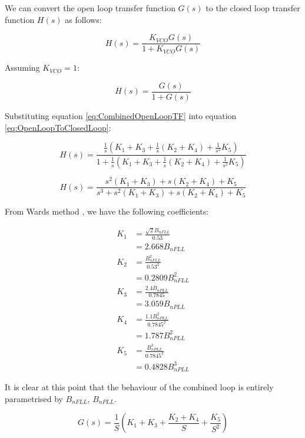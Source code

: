 We can convert the open loop transfer function $G(s)$ to the closed loop transfer function $H(s)$ as follows\cite{KazemiPHD,Gardner}:

\begin{equation}
 H(s) = \frac{K_{VCO}G(s)}{1+K_{VCO}G(s)}
\end{equation}

Assuming $K_{VCO}=1$:

\begin{equation}
 H(s) = \frac{G(s)}{1+G(s)}
\label{eq:OpenLoopToClosedLoop}
\end{equation}

Substituting equation \ref{eq:CombinedOpenLoopTF} into equation \ref{eq:OpenLoopToClosedLoop}:

\begin{equation}
 H(s) = \frac{\frac{1}{s} (K_1+K_3 + \frac{1}{s}(K_2+K_4) + \frac{1}{s^2} K_5)}{1+\frac{1}{s} (K_1+K_3 + \frac{1}{s}(K_2+K_4) + \frac{1}{s^2} K_5)}
\end{equation}

\begin{equation}
 H(s) = \frac{s^2(K_1+K_3) + s(K_2+K_4) + K_5}
 {s^3+ s^2(K_1+K_3)+ s(K_2+K_4) + K_5}
\end{equation}
\clearpage


From Wards method \cite{Ward}, we have the following coefficients:

\begin{align*}
K_1 &=\frac{\sqrt{2}B_{nFLL}}{0.53}\\
    &= 2.668 B_{nFLL}\\
K_2 &=\frac{B_{nFLL}^2}{0.53^2}\\
    &= 0.2809 B_{nFLL}^2\\
K_3 &=\frac{2.4B_{nPLL}}{0.7845}\\ 
    &=3.059 B_{nPLL}\\
K_4 &=\frac{1.1B_{nPLL}^2}{0.7845^2}\\
    &=1.787 B_{nPLL}^2\\
K_5 &=\frac{B_{nPLL}^3}{0.7845^3}\\
    &=0.4828B_{nPLL}^3
\end{align*}

It is clear at this point that the behaviour of the combined loop is entirely parametrised by $B_{nFLL}$,  $B_{nPLL}$.

\begin{equation}
G(s) = \frac{1}{S}(K_1 + K_3 + \frac{K_2 + K_4}{S} + \frac{K_5}{S^2})
\end{equation}

